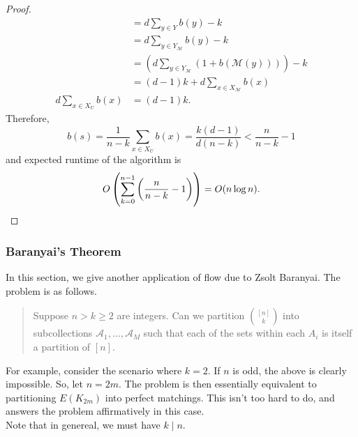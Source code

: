 \begin{proof}
\begin{align*}
						&= d \sum_{y \in Y} b(y) - k \\
						&= d \sum_{y \in Y_\mathcal{M}} b(y) - k \\
						&= \left(d \sum_{y \in Y_\mathcal{M}} (1 + b(\mathcal{M}(y)))\right) - k \\
						&= (d-1)k + d \sum_{x \in X_\mathcal{M}} b(x) \\
					d \sum_{x \in X_U} b(x) &= (d-1)k.
				\end{align*}
				Therefore,
				\[ b(s) = \frac{1}{n-k} \sum_{x \in X_U} b(x) = \frac{k(d-1)}{d(n-k)} < \frac{n}{n-k} - 1 \]
				and expected runtime of the algorithm is
				\[ O\left(\sum_{k=0}^{n-1} \left( \frac{n}{n-k} - 1 \right)\right) = O(n\log n). \qedhere \]
			\end{proof}

		\subsubsection{Baranyai's Theorem}

			In this section, we give another application of flow due to Zsolt Baranyai. The problem is as follows.

			\begin{quote}
				Suppose $n > k \ge 2$ are integers. Can we partition $\binom{[n]}{k}$ into subcollections $\mathcal{A}_1,\ldots,\mathcal{A}_M$ such that each of the sets within each $A_i$ is itself a partition of $[n]$. 
			\end{quote}

			For example, consider the scenario where $k=2$. If $n$ is odd, the above is clearly impossible. So, let $n = 2m$. The problem is then essentially equivalent to partitioning $E(K_{2m})$ into perfect matchings. This isn't too hard to do, and answers the problem affirmatively in this case.\\
			Note that in genereal, we must have $k\mid n$.

